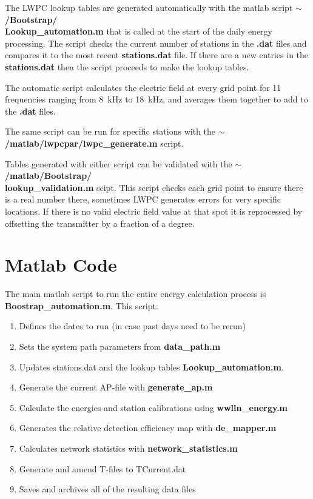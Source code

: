 The LWPC lookup tables are generated automatically with the matlab script {\bf $\sim$/Bootstrap/\\Lookup\_automation.m} that is called at the start of the daily energy processing.
The script checks the current number of stations in the \textbf{.dat} files and compares it to the most recent \textbf{stations.dat} file.
If there are a new entries in the \textbf{stations.dat} then the script proceeds to make the lookup tables.

The automatic script calculates the electric field at every grid point for 11 frequencies ranging from 8~kHz to 18~kHz, and averages them together to add to the \textbf{.dat} files.

The same script can be run for specific stations with the \textbf{$\sim$/matlab/lwpcpar/lwpc\_generate.m} script.

Tables generated with either script can be validated with the \textbf{$\sim$/matlab/Bootstrap/\\lookup\_validation.m} scipt.
This script checks each grid point to ensure there is a real number there, sometimes LWPC generates errors for very specific locations.
If there is no valid electric field value at that spot it is reprocessed by offsetting the transmitter by a fraction of a degree.

\section{Matlab Code}

The main matlab script to run the entire energy calculation process is {\bf Boostrap\_automation.m}.
This script:
\begin{enumerate}
\item{Defines the dates to run (in case past days need to be rerun)}
\item{Sets the system path parameters from {\bf data\_path.m}}
\item{Updates stations.dat and the lookup tables {\bf Lookup\_automation.m}.}
\item{Generate the current AP-file with {\bf generate\_ap.m}}
\item{Calculate the energies and station calibrations using {\bf wwlln\_energy.m}}
\item{Generates the relative detection efficiency map with {\bf de\_mapper.m}}
\item{Calculates network statistics with {\bf network\_statistics.m}}
\item{Generate and amend T-files to TCurrent.dat}
\item{Saves and archives all of the resulting data files}
\end{enumerate}

